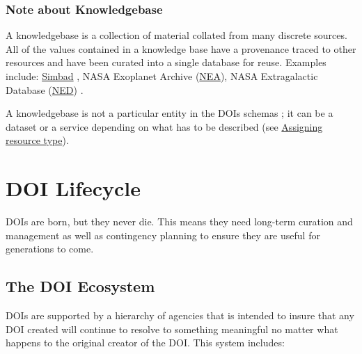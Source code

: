 \documentclass[11pt,a4paper]{ivoa}
\begin{document}
\subsubsection{Note about Knowledgebase}\hypertarget{note-about-knowledgebase}{}\label{sec:note-about-knowledgebase}

A knowledgebase is a collection of material collated from many discrete sources. All of the values contained in a knowledge base have a provenance traced to other resources and have been curated into a single database for reuse. Examples include: \href{https://simbad.cds.unistra.fr/}{Simbad} \citep{2000A&AS..143....9W}, NASA Exoplanet Archive \citep{2013PASP..125..989A} (\href{https://exoplanetarchive.ipac.caltech.edu/}{NEA}), NASA Extragalactic Database (\href{https://ned.ipac.caltech.edu/}{NED}) \citep{1991ASSL..171...89H}.

A knowledgebase is not a particular entity in the DOIs schemas ; it can be a dataset or a service depending on what has to be described (see \hyperlink{assigning-resource-type}{Assigning resource type}).

\section{DOI Lifecycle}\hypertarget{doi-lifecycle}{}\label{sec:doi-lifecycle}

DOIs are born, but they never die. This means they need long-term curation and management as well as contingency planning to ensure they are useful for generations to come.

\subsection{The DOI Ecosystem}\hypertarget{the-doi-ecosystem}{}\label{sec:the-doi-ecosystem}

DOIs are supported by a hierarchy of agencies that is intended to insure that any DOI created will continue to resolve to something meaningful no matter what happens to the original creator of the DOI. This system includes:
\end{document}

